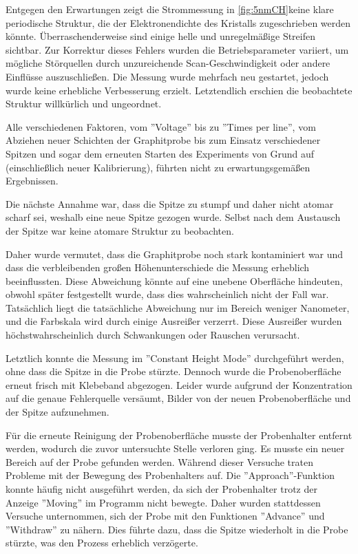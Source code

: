 Entgegen den Erwartungen zeigt die Strommessung in \cref{fig:5nmCH}keine klare periodische Struktur, die der Elektronendichte des Kristalls zugeschrieben werden könnte. 
Überraschenderweise sind einige helle und unregelmäßige Streifen sichtbar. Zur Korrektur dieses Fehlers wurden die Betriebsparameter variiert, um mögliche Störquellen durch unzureichende Scan-Geschwindigkeit oder andere Einflüsse auszuschließen. 
Die Messung wurde mehrfach neu gestartet, jedoch wurde keine erhebliche Verbesserung erzielt. Letztendlich erschien die beobachtete Struktur willkürlich und ungeordnet.

Alle verschiedenen Faktoren, vom ''Voltage'' bis zu ''Times per line'', vom Abziehen neuer Schichten der Graphitprobe bis zum Einsatz verschiedener Spitzen und sogar dem erneuten Starten des Experiments von Grund auf (einschließlich neuer Kalibrierung), führten nicht zu erwartungsgemäßen Ergebnissen.


Die nächste Annahme war, dass die Spitze zu stumpf und daher nicht atomar scharf sei, weshalb eine neue Spitze gezogen wurde. Selbst nach dem Austausch der Spitze war keine atomare Struktur zu beobachten.

Daher wurde vermutet, dass die Graphitprobe noch stark kontaminiert war und dass die verbleibenden großen Höhenunterschiede die Messung erheblich beeinflussten. Diese Abweichung könnte auf eine unebene Oberfläche hindeuten, obwohl später festgestellt wurde, dass dies wahrscheinlich nicht der Fall war. Tatsächlich liegt die tatsächliche Abweichung nur im Bereich weniger Nanometer, und die Farbskala wird durch einige Ausreißer verzerrt. Diese Ausreißer wurden höchstwahrscheinlich durch Schwankungen oder Rauschen verursacht.


Letztlich konnte die Messung im ''Constant Height Mode'' durchgeführt werden, ohne dass die Spitze in die Probe stürzte. Dennoch wurde die Probenoberfläche erneut frisch mit Klebeband abgezogen. Leider wurde aufgrund der Konzentration auf die genaue Fehlerquelle versäumt, Bilder von der neuen Probenoberfläche und der Spitze aufzunehmen.


Für die erneute Reinigung der Probenoberfläche musste der Probenhalter entfernt werden, wodurch die zuvor untersuchte Stelle verloren ging. Es musste ein neuer Bereich auf der Probe gefunden werden. Während dieser Versuche traten Probleme mit der Bewegung des Probenhalters auf. Die ''Approach''-Funktion konnte häufig nicht ausgeführt werden, da sich der Probenhalter trotz der Anzeige ''Moving'' im Programm nicht bewegte. Daher wurden stattdessen Versuche unternommen, sich der Probe mit den Funktionen ''Advance'' und ''Withdraw'' zu nähern. Dies führte dazu, dass die Spitze wiederholt in die Probe stürzte, was den Prozess erheblich verzögerte.
\clearpage
